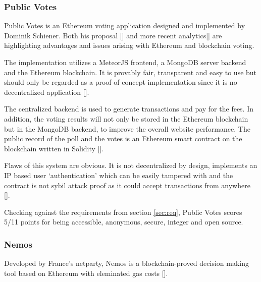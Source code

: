 \subsubsection{Public Votes}
\label{sec:pubv}
Public Votes is an Ethereum voting application designed and implemented by Dominik Schiener. Both his proposal [\cite{SCHIENER2015A}] and more recent analytics[\cite{SCHIENER2015B}] are highlighting advantages and issues arising with Ethereum and blockchain voting.\par
The implementation utilizes a MeteorJS frontend, a MongoDB server backend and the Ethereum blockchain. It is provably fair, transparent and easy to use but should only be regarded as a proof-of-concept implementation since it is no decentralized application [\cite{SCHIENER2015A}].\par
The centralized backend is used to generate transactions and pay for the fees. In addition, the voting results will not only be stored in the Ethereum blockchain but in the MongoDB backend, to improve the overall website performance. The public record of the poll and the votes is an Ethereum smart contract on the blockchain written in Solidity [\cite{SCHIENER2015A}].\par
Flaws of this system are obvious. It is not decentralized by design, implements an IP based user \enquote*{authentication} which can be easily tampered with and the contract is not sybil attack proof as it could accept transactions from anywhere [\cite{SCHIENER2015B}].\par
Checking against the requirements from section \ref{sec:req}, Public Votes scores 5/11 points for being accessible, anonymous, secure, integer and open source.

\subsubsection{Nemos}
Developed by France's netparty, Nemos is a blockchain-proved decision making tool based on Ethereum with eleminated gas costs [\cite{MARGOT-DUCLOT2015}]. %


